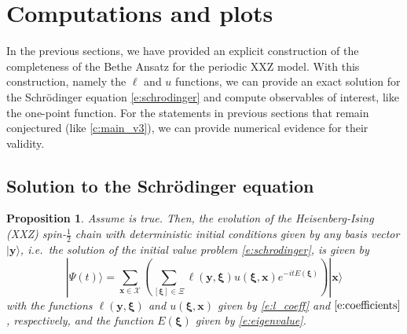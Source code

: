 \documentclass[a4paper,11pt]{article}
\newtheorem{proposition}[theorem]{Proposition}
\theoremstyle{definition}
\begin{document}
\section{Computations and plots}\label{s:functions}

In the previous sections, we have provided an explicit construction of the completeness of the Bethe Ansatz for the periodic XXZ model. With this construction, namely the $\ell$ and $u$ functions, we can provide an exact solution for the Schr\"odinger equation \eqref{e:schrodinger} and compute observables of interest, like the one-point function. For the statements in previous sections that remain conjectured (like \eqref{c:main_v3}), we can provide numerical evidence for their validity.

\subsection{Solution to the Schr\"odinger equation}


\begin{proposition}\label{p:solution}
Assume  is true. Then, the evolution of the Heisenberg-Ising (XXZ) spin-$\tfrac{1}{2}$ chain with deterministic initial conditions given by any basis vector $|\mathbf{y} \rangle$, i.e.~the solution of the initial value problem \eqref{e:schrodinger}, is given by
    \begin{equation}
    |\Psi(t) \rangle  = \sum_{\mathbf{x} \in \mathcal{X}} \left(\sum_{[\boldsymbol{\xi}] \in \Xi} \ell(\mathbf{y}, \boldsymbol{\xi})u(\boldsymbol{\xi}, \mathbf{x}) e^{-i t E(\boldsymbol{\xi})}\right) | \mathbf{x} \rangle
    \end{equation}
with the functions $\ell(\mathbf{y}, \boldsymbol{\xi})$ and $u(\boldsymbol{\xi},\mathbf{x})$ given by \eqref{e:l_coeff} and $\eqref{e:coefficients}$, respectively, and the function $E(\boldsymbol{\xi})$ given by \eqref{e:eigenvalue}.
\end{proposition}
\end{document}
